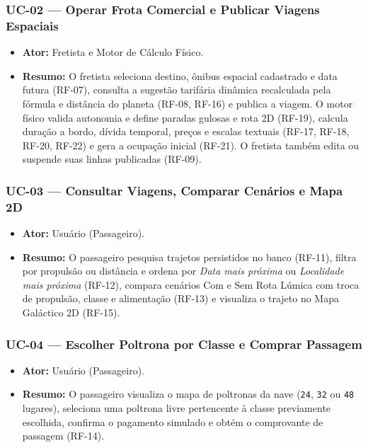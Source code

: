 \documentclass[12pt, a4paper]{article}
\begin{document}
\subsubsection{UC-02 --- Operar Frota Comercial e Publicar Viagens Espaciais}
\begin{itemize}
    \item \textbf{Ator:} Fretista e Motor de Cálculo Físico.
    \item \textbf{Resumo:} O fretista seleciona destino, ônibus espacial cadastrado e data futura (RF-07), consulta a sugestão tarifária dinâmica recalculada pela fórmula e distância do planeta (RF-08, RF-16) e publica a viagem. O motor físico valida autonomia e define paradas gulosas e rota 2D (RF-19), calcula duração a bordo, dívida temporal, preços e escalas textuais (RF-17, RF-18, RF-20, RF-22) e gera a ocupação inicial (RF-21). O fretista também edita ou suspende suas linhas publicadas (RF-09).
\end{itemize}

\subsubsection{UC-03 --- Consultar Viagens, Comparar Cenários e Mapa 2D}
\begin{itemize}
    \item \textbf{Ator:} Usuário (Passageiro).
    \item \textbf{Resumo:} O passageiro pesquisa trajetos persistidos no banco (RF-11), filtra por propulsão ou distância e ordena por \textit{Data mais próxima} ou \textit{Localidade mais próxima} (RF-12), compara cenários Com e Sem Rota Lúmica com troca de propulsão, classe e alimentação (RF-13) e visualiza o trajeto no Mapa Galáctico 2D (RF-15).
\end{itemize}

\subsubsection{UC-04 --- Escolher Poltrona por Classe e Comprar Passagem}
\begin{itemize}
    \item \textbf{Ator:} Usuário (Passageiro).
    \item \textbf{Resumo:} O passageiro visualiza o mapa de poltronas da nave (\texttt{24}, \texttt{32} ou \texttt{48} lugares), seleciona uma poltrona livre pertencente à classe previamente escolhida, confirma o pagamento simulado e obtém o comprovante de passagem (RF-14).
\end{itemize}
\end{document}
